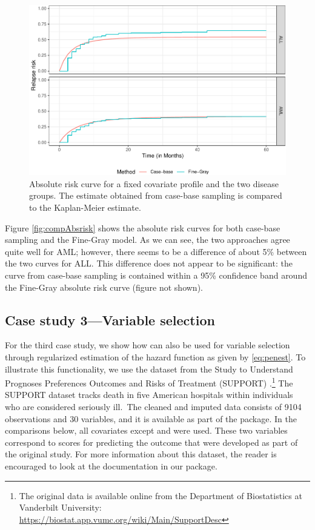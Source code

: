 \begin{Schunk}
\begin{figure}[ht]
\includegraphics[width=\textwidth,keepaspectratio=true]{./bmtcrr-risk-1} \caption{\label{fig:compAbsrisk} Absolute risk curve for a fixed covariate profile and the two disease groups. The estimate obtained from case-base sampling is compared to the Kaplan-Meier estimate.}\label{fig:bmtcrr-risk}
\end{figure}
\end{Schunk}

Figure \ref{fig:compAbsrisk} shows the absolute risk curves for both
case-base sampling and the Fine-Gray model. As we can see, the two
approaches agree quite well for AML; however, there seems to be a
difference of about 5\% between the two curves for ALL. This difference
does not appear to be significant: the curve from case-base sampling is
contained within a 95\% confidence band around the Fine-Gray absolute
risk curve (figure not shown).

\hypertarget{case-study-3variable-selection}{%
\subsection{Case study 3---Variable
selection}\label{case-study-3variable-selection}}

For the third case study, we show how  can also be used
for variable selection through regularized estimation of the hazard
function as given by \eqref{eq:penest}. To illustrate this
functionality, we use the dataset from the Study to Understand Prognoses
Preferences Outcomes and Risks of Treatment (SUPPORT)
\citep{knaus1995support}.\footnote{The original data is available online from the Department of Biostatistics at Vanderbilt University: \url{https://biostat.app.vumc.org/wiki/Main/SupportDesc}}
The SUPPORT dataset tracks death in five American hospitals within
individuals who are considered seriously ill.~The cleaned and imputed
data consists of 9104 observations and 30 variables, and it is available
as part of the  package. In the comparisons below, all
covariates except  and  were used. These two
variables correspond to scores for predicting the outcome that were
developed as part of the original study. For more information about this
dataset, the reader is encouraged to look at the documentation in our
package.

